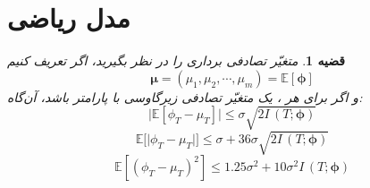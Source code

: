 \documentclass[]{beamer}
\newtheorem{thm}{{\large\bf قضیه}}[section]
\newcommand{\E}{\mathbb{E}}
\begin{document}
\begin{persian}
\begin{frame}
\begin{figure}[h!]
\begin{tikzpicture}[auto, node distance=0.5cm, every loop/.style={},
	thick,state/.style={font=\sffamily\Large}, scale = 0.93]
	\end{tikzpicture}
\end{figure}

\end{frame}


\section{مدل ریاضی}




\begin{frame}



{
\begin{thm}
	متغیّر تصادفی برداری
	را در نظر بگیرید، اگر تعریف کنیم
	\[\bm{\mu} = (\mu_1,\mu_2,\cdots,\mu_m)=\E[\bm{\phi}]\]
	و اگر برای هر
	،
	یک متغیّر تصادفی زیرگاوسی با پارامتر
	\lr{$\sigma$}
	باشد، آن‌گاه:
	\begin{equation}
	\Big|\E[\phi_T-\mu_T]\Big|\leq \sigma\sqrt{2I\,(T;\bm{\phi})}
	\end{equation}
	\begin{equation}
	\E\Big[\big|\phi_T-\mu_T\big|\Big]\leq \sigma + 36\sigma\sqrt{2I\,(T;\bm{\phi})}
	\end{equation}
	\begin{equation}
	\E\left[(\phi_T-\mu_T)^2\right]\leq 1.25\sigma^2 + 10\sigma^2I\,(T;\bm{\phi})
	\end{equation}

\end{thm}
}
\end{frame}




\end{persian}
\end{document}

